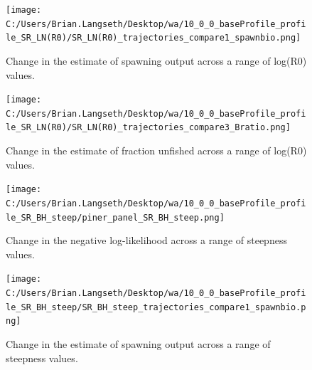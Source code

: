 \documentclass[11pt,
  english,
  a4paper,
]{article}
\begin{document}
\begin{figure}
\centering
\texttt{[image: C:/Users/Brian.Langseth/Desktop/wa/10\_0\_0\_baseProfile\_profile\_SR\_LN(R0)/SR\_LN(R0)\_trajectories\_compare1\_spawnbio.png]}
\caption{Change in the estimate of spawning output across a range of log(R0) values.\label{fig:r0-ssb}}
\end{figure}

\tagmcend\tagstructend


\begin{figure}
\centering
\texttt{[image: C:/Users/Brian.Langseth/Desktop/wa/10\_0\_0\_baseProfile\_profile\_SR\_LN(R0)/SR\_LN(R0)\_trajectories\_compare3\_Bratio.png]}
\caption{Change in the estimate of fraction unfished across a range of log(R0) values.\label{fig:r0-depl}}
\end{figure}

\tagmcend\tagstructend


\begin{figure}
\centering
\texttt{[image: C:/Users/Brian.Langseth/Desktop/wa/10\_0\_0\_baseProfile\_profile\_SR\_BH\_steep/piner\_panel\_SR\_BH\_steep.png]}
\caption{Change in the negative log-likelihood across a range of steepness values.\label{fig:h-profile}}
\end{figure}

\tagmcend\tagstructend


\begin{figure}
\centering
\texttt{[image: C:/Users/Brian.Langseth/Desktop/wa/10\_0\_0\_baseProfile\_profile\_SR\_BH\_steep/SR\_BH\_steep\_trajectories\_compare1\_spawnbio.png]}
\caption{Change in the estimate of spawning output across a range of steepness values.\label{fig:h-ssb}}
\end{figure}

\tagmcend\tagstructend

\end{document}
